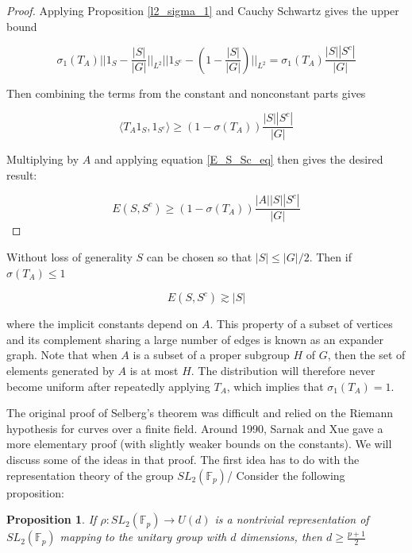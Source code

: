 \documentclass[12pt]{amsart}
\newtheorem{prop}[theorem]{Proposition}
\begin{document}
\begin{proof}
Applying Proposition \ref{l2_sigma_1} and Cauchy Schwartz gives the upper bound 

\[ \sigma_1(T_A) ||1_S - \frac{|S|}{|G|}||_{L^2}||1_{S^c} - (1 - \frac{|S|}{|G|} )||_{L^2} = \sigma_1(T_A) \frac{|S||S^c|}{|G|} \] 

Then combining the terms from the constant and nonconstant parts gives 

\[ \langle T_A 1_S, 1_{S^c} \rangle  \geq (1 - \sigma(T_A))\frac{|S||S^c|}{|G|}\]

Multiplying by $A$ and applying equation \ref{E_S_Sc_eq} then gives the desired result: 



\[E(S, S^c) \geq (1 - \sigma(T_A))\frac{|A||S||S^c|}{|G|}\]


\end{proof}

Without loss of generality $S$ can be chosen so that $|S| \leq |G|/2$. Then if $\sigma(T_A) \leq 1$

\[E(S, S^c) \gtrsim |S| \] 

where the implicit constants depend on $A$. This property of a subset of vertices and its complement sharing a large number of edges is known as an expander graph. Note that when $A$ is a subset of a proper subgroup $H$ of $G$, then the set of elements generated by $A$ is at most $H$. The distribution will therefore never become uniform after repeatedly applying $T_A$, which implies that $\sigma_1(T_A) = 1$. 

The original proof of Selberg's theorem was difficult and relied on the Riemann hypothesis for curves over a finite field.   Around 1990,  Sarnak and Xue gave a more elementary proof (with slightly weaker bounds on the constants).   We will discuss some of the ideas in that proof.   The first idea has to do with the representation theory of the group $SL_2(\mathbb{F}_p)$/  Consider the following proposition:

\begin{prop}
If $\rho: SL_2(\mathbb{F}_p) \to U(d)$ is a nontrivial representation of $SL_2(\mathbb{F}_p)$ mapping to the unitary group with $d$ dimensions, then $d \geq \frac{p+1}{2} $ 
\end{prop}
\end{document}

